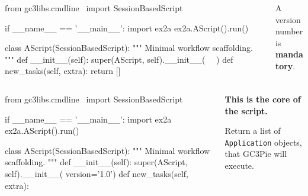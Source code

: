 \documentclass[english,serif,mathserif,xcolor=pdftex,dvipsnames,table]{beamer}
\begin{document}
\begin{frame}[fragile]
  \begin{columns}
    \begin{column}{0.7\linewidth}
\begin{python}
from gc3libs.cmdline \
  import SessionBasedScript

if __name__ == '__main__':
  import ex2a
  ex2a.AScript().run()

class AScript(SessionBasedScript):
  """
  Minimal workflow scaffolding.
  """
  def __init__(self):
    super(AScript, self).__init__(
      ~~)
  def new_tasks(self, extra):
    return []
\end{python}
    \end{column}
    \begin{column}{0.4\linewidth}
      \begin{flushright}
        A version number \\ is \textbf{mandatory}.
      \end{flushright}
    \end{column}
  \end{columns}
\end{frame}


\begin{frame}[fragile]
  \begin{columns}
    \begin{column}{0.7\linewidth}
\begin{python}
from gc3libs.cmdline \
  import SessionBasedScript

if __name__ == '__main__':
  import ex2a
  ex2a.AScript().run()

class AScript(SessionBasedScript):
  """
  Minimal workflow scaffolding.
  """
  def __init__(self):
    super(AScript, self).__init__(
        version='1.0')
  def new_tasks(self, extra):
    ~~
\end{python}
    \end{column}
    \begin{column}{0.4\linewidth}
      \begin{flushright}
        \textbf{This is the core of the script.}

        \+
        Return a list of \texttt{Application} objects, that GC3Pie will execute.
      \end{flushright}
    \end{column}
  \end{columns}
\end{frame}
\end{document}
